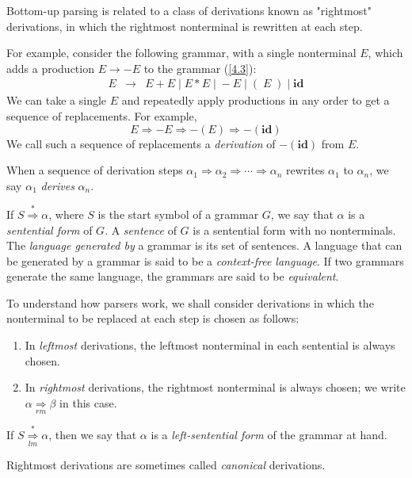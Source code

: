 \documentclass[12pt,a4paper,twoside,openany]{book}
\begin{document}
Bottom-up parsing is related to a class of derivations known as "rightmost" derivations, in which the rightmost nonterminal is rewritten at each step.

For example, consider the following grammar, with a single nonterminal $E$, which adds a production $E\to-E$ to the grammar (\ref{4.3}):
\begin{equation}
    \begin{array}{ccc}E&\rightarrow&E+E\;|\;E*E\;|\;-E\;|\;(\;E\;)\;|\;\textbf{id}\end{array}
    \label{4.7}
\end{equation}
We can take a single $E$ and repeatedly apply productions in any order to get a sequence of replacements. For example, $$E\Rightarrow-E\Rightarrow-(E)\Rightarrow-(\textbf{id})$$ We call such a sequence of replacements a \textit{derivation} of $-(\textbf{id})$ from $E$.

When a sequence of derivation steps $\alpha_1\Rightarrow\alpha_2\Rightarrow\cdots\Rightarrow\alpha_n$ rewrites $\alpha_1$ to $\alpha_n$, we say $\alpha_1$ \textit{derives} $\alpha_n$.

If $S\overset{*}{\Rightarrow}\alpha$, where $S$ is the start symbol of a grammar $G$, we say that $\alpha$ is a \textit{sentential form} of $G$. A \textit{sentence} of $G$ is a sentential form with no nonterminals. The \textit{language generated by} a grammar is its set of sentences. A language that can be generated by a grammar is said to be a \textit{context-free language}. If two grammars generate the same language, the grammars are said to be \textit{equivalent}.

To understand how parsers work, we shall consider derivations in which the nonterminal to be replaced at each step is chosen as follows:
\begin{enumerate}
    \item In \textit{leftmost} derivations, the leftmost nonterminal in each sentential is always chosen.
    \item In \textit{rightmost} derivations, the rightmost nonterminal is always chosen; we write $\alpha\underset{rm}{\Rightarrow}\beta$ in this case.
\end{enumerate}

If $S\overset{*}{\underset{lm}{\Rightarrow}}\alpha$, then we say that $\alpha$ is a \textit{left-sentential form} of the grammar at hand.

Rightmost derivations are sometimes called \textit{canonical} derivations.
\end{document}
